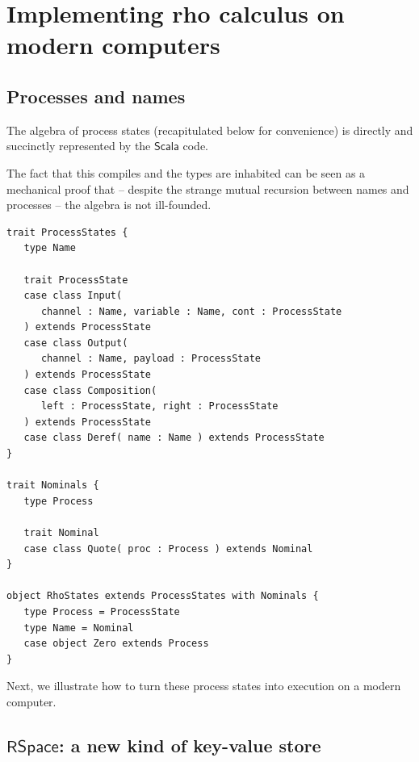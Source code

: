 \section{Implementing rho calculus on modern computers}

\subsection{Processes and names}
The algebra of process states (recapitulated below for convenience) is
directly and succinctly represented by the $\mathsf{Scala}$ code. 


The fact that this compiles and the types are inhabited can be seen as
a mechanical proof that -- despite the strange mutual recursion
between names and processes -- the algebra is not ill-founded.

\begin{lstlisting}
trait ProcessStates {
   type Name

   trait ProcessState
   case class Input(
      channel : Name, variable : Name, cont : ProcessState
   ) extends ProcessState
   case class Output(
      channel : Name, payload : ProcessState
   ) extends ProcessState
   case class Composition(
      left : ProcessState, right : ProcessState
   ) extends ProcessState
   case class Deref( name : Name ) extends ProcessState
}

trait Nominals {
   type Process

   trait Nominal
   case class Quote( proc : Process ) extends Nominal
}

object RhoStates extends ProcessStates with Nominals {
   type Process = ProcessState
   type Name = Nominal
   case object Zero extends Process
}
\end{lstlisting}

Next, we illustrate how to turn these process states into execution on
a modern computer.

\subsection{$\mathsf{RSpace}$: a new kind of key-value store}

